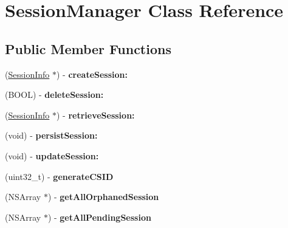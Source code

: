 \hypertarget{interface_session_manager}{
\section{SessionManager Class Reference}
\label{interface_session_manager}
}
\subsection*{Public Member Functions}
\begin{DoxyCompactItemize}
\item 
\hypertarget{interface_session_manager_a75e944ee0d6f65d938082efadb8690e7}{
(\hyperlink{interface_session_info}{SessionInfo} $\ast$) -\/ {\bfseries createSession:}}
\label{interface_session_manager_a75e944ee0d6f65d938082efadb8690e7}

\item 
\hypertarget{interface_session_manager_aa6a6cf47150aed93b0d8ad09168439c3}{
(BOOL) -\/ {\bfseries deleteSession:}}
\label{interface_session_manager_aa6a6cf47150aed93b0d8ad09168439c3}

\item 
\hypertarget{interface_session_manager_a5f31f49be44ccef29673c82e7d024a78}{
(\hyperlink{interface_session_info}{SessionInfo} $\ast$) -\/ {\bfseries retrieveSession:}}
\label{interface_session_manager_a5f31f49be44ccef29673c82e7d024a78}

\item 
\hypertarget{interface_session_manager_a17b463aec20fd8d968b264584f9a3bbc}{
(void) -\/ {\bfseries persistSession:}}
\label{interface_session_manager_a17b463aec20fd8d968b264584f9a3bbc}

\item 
\hypertarget{interface_session_manager_a7b33e69f4e69cda054b78538f280cd77}{
(void) -\/ {\bfseries updateSession:}}
\label{interface_session_manager_a7b33e69f4e69cda054b78538f280cd77}

\item 
\hypertarget{interface_session_manager_a6d614a8b9be54bc06e590eb250d7c4d8}{
(uint32\_\-t) -\/ {\bfseries generateCSID}}
\label{interface_session_manager_a6d614a8b9be54bc06e590eb250d7c4d8}

\item 
\hypertarget{interface_session_manager_a453bcb0bbfbdfa7b7fb86c395443bc7c}{
(NSArray $\ast$) -\/ {\bfseries getAllOrphanedSession}}
\label{interface_session_manager_a453bcb0bbfbdfa7b7fb86c395443bc7c}

\item 
\hypertarget{interface_session_manager_af5f1b4c870d88b81cf49bed3bb48753b}{
(NSArray $\ast$) -\/ {\bfseries getAllPendingSession}}
\label{interface_session_manager_af5f1b4c870d88b81cf49bed3bb48753b}

\end{DoxyCompactItemize}
